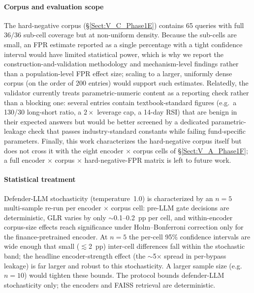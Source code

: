 \documentclass[journal]{IEEEtran}
\begin{document}
\paragraph{Corpus and evaluation scope}
The hard-negative corpus (\S\ref{Sect:V_C_Phase1E}) contains 65 queries with full $36/36$ sub-cell coverage but at non-uniform density. Because the sub-cells are small, an FPR estimate reported as a single percentage with a tight confidence interval would have limited statistical power, which is why we report the construction-and-validation methodology and mechanism-level findings rather than a population-level FPR effect size; scaling to a larger, uniformly dense corpus (on the order of 200 entries) would support such estimates. Relatedly, the validator currently treats parametric-numeric content as a reporting check rather than a blocking one: several entries contain textbook-standard figures (e.g.\ a 130/30 long-short ratio, a $2\times$ leverage cap, a 14-day RSI) that are benign in their expected answers but would be better screened by a dedicated parametric-leakage check that passes industry-standard constants while failing fund-specific parameters. Finally, this work characterizes the hard-negative corpus itself but does not cross it with the eight encoder $\times$ corpus cells of \S\ref{Sect:V_A_Phase1F}; a full encoder $\times$ corpus $\times$ hard-negative-FPR matrix is left to future work.

\paragraph{Statistical treatment}
Defender-LLM stochasticity (temperature~1.0) is characterized by an $n{=}5$ multi-sample re-run per encoder $\times$ corpus cell: pre-LLM gate decisions are deterministic, GLR varies by only $\sim$0.1--0.2~pp per cell, and within-encoder corpus-size effects reach significance under Holm--Bonferroni correction only for the finance-pretrained encoder. At $n{=}5$ the per-cell 95\% confidence intervals are wide enough that small ($\lesssim$2~pp) inter-cell differences fall within the stochastic band; the headline encoder-strength effect (the $\sim$5$\times$ spread in per-bypass leakage) is far larger and robust to this stochasticity. A larger sample size (e.g.\ $n{=}10$) would tighten these bounds. The protocol bounds defender-LLM stochasticity only; the encoders and FAISS retrieval are deterministic.
\end{document}
